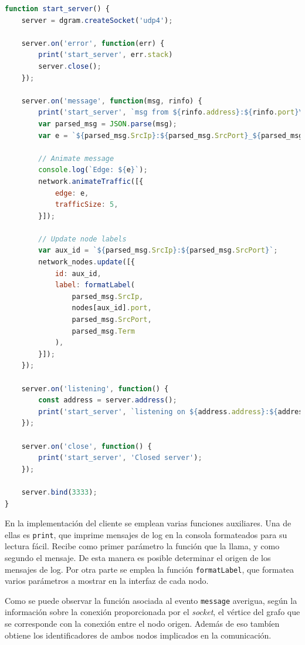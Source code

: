 \begin{lstlisting}[language=JavaScript]
function start_server() {
    server = dgram.createSocket('udp4');

    server.on('error', function(err) {
        print('start_server', err.stack)
        server.close();
    });

    server.on('message', function(msg, rinfo) {
        print('start_server', `msg from ${rinfo.address}:${rinfo.port}\n${msg}`);
        var parsed_msg = JSON.parse(msg);
        var e = `${parsed_msg.SrcIp}:${parsed_msg.SrcPort}_${parsed_msg.DstIp}:${parsed_msg.DstPort}`

        // Animate message
        console.log(`Edge: ${e}`);
        network.animateTraffic([{
            edge: e,
            trafficSize: 5,
        }]);
        
        // Update node labels
        var aux_id = `${parsed_msg.SrcIp}:${parsed_msg.SrcPort}`;
        network_nodes.update([{
            id: aux_id,
            label: formatLabel(
                parsed_msg.SrcIp,
                nodes[aux_id].port,
                parsed_msg.SrcPort,
                parsed_msg.Term
            ),
        }]);
    });

    server.on('listening', function() {
        const address = server.address();
        print('start_server', `listening on ${address.address}:${address.port}`);
    });

    server.on('close', function() {
        print('start_server', 'Closed server');
    });

    server.bind(3333);
}
\end{lstlisting}

En la implementación del cliente se emplean varias funciones auxiliares. Una de ellas es \texttt{print}, que imprime mensajes de log en la consola formateados para su lectura fácil. Recibe como primer parámetro la función que la llama, y como segundo el mensaje. De esta manera es posible determinar el origen de los mensajes de log. Por otra parte se emplea la función \texttt{formatLabel}, que formatea varios parámetros a mostrar en la interfaz de cada nodo.

Como se puede observar la función asociada al evento \texttt{message} averigua, según la información sobre la conexión proporcionada por el \textit{socket}, el vértice del grafo que se corresponde con la conexión entre el nodo origen. Además de eso tambíen obtiene los identificadores de ambos nodos implicados en la comunicación.

